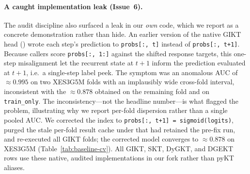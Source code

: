 \documentclass[runningheads]{llncs}
\begin{document}
\paragraph{A caught implementation leak (Issue~6).}
The audit discipline also surfaced a leak in our \emph{own} code, which we
report as a concrete demonstration rather than hide. An earlier version of
the native GIKT head () wrote each step's prediction
to \texttt{probs[:,\,t]} instead of \texttt{probs[:,\,t+1]}. Because callers
score \texttt{probs[:,\,1:]} against the shifted response targets, this
one-step misalignment let the recurrent state at $t{+}1$ inform the prediction
evaluated at $t{+}1$, i.e.\ a single-step label peek. The symptom was an
anomalous AUC of ${\approx}0.995$ on two XES3G5M folds with an implausibly wide
cross-fold interval, inconsistent with the ${\approx}0.878$ obtained on the
remaining fold and on \texttt{train\_only}. The inconsistency---not the
headline number---is what flagged the problem, illustrating why we report
per-fold dispersion rather than a single pooled AUC. We corrected the index to
\texttt{probs[:,\,t+1]\,=\,sigmoid(logits)}, purged the stale per-fold result
cache under  that had retained the pre-fix run, and
re-executed all GIKT folds; the corrected model converges to
${\approx}0.878$ on XES3G5M (Table~\ref{tab:baseline-cv}). All GIKT, SKT,
DyGKT, and DGEKT rows use these native, audited implementations in our fork
rather than pyKT aliases.
\end{document}
